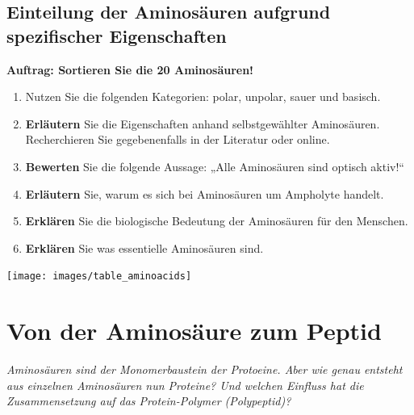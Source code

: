 \documentclass{scrartcl}  %
\begin{document}
\newpage
		\subsection{Einteilung der Aminosäuren aufgrund spezifischer Eigenschaften}
		
			\textbf{Auftrag: Sortieren Sie die 20 Aminosäuren!}
			\begin{enumerate}
				\item Nutzen Sie die folgenden Kategorien: polar, unpolar, sauer und basisch.
			    \item \textbf{Erläutern} Sie die Eigenschaften anhand selbstgewählter Aminosäuren. Recherchieren Sie gegebenenfalls in der Literatur oder online.
			    \item \textbf{Bewerten} Sie die folgende Aussage: „Alle Aminosäuren sind optisch aktiv!“
			    \item \textbf{Erläutern} Sie, warum es sich bei Aminosäuren um Ampholyte handelt.
			    \item \textbf{Erklären} Sie die biologische Bedeutung der Aminosäuren für den Menschen.
			    \item \textbf{Erklären} Sie was essentielle Aminosäuren sind.
			\end{enumerate} 
			
			\begin{center}
				\texttt{[image: images/table\_aminoacids]}
			\end{center}
			
\newpage
	\section{Von der Aminosäure zum Peptid}
	
		\textit{Aminosäuren sind der Monomerbaustein der Protoeine. Aber wie genau entsteht aus einzelnen Aminosäuren nun Proteine? Und welchen Einfluss hat die Zusammensetzung auf das Protein-Polymer (Polypeptid)?} \newline
	
\end{document}
